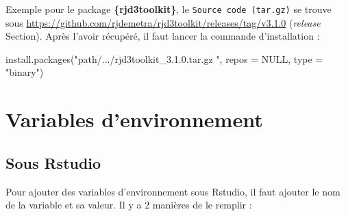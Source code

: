 \documentclass[
]{article}
\newenvironment{Shaded}{\begin{snugshade}}{\end{snugshade}}
\newcommand{\AttributeTok}[1]{\textcolor[rgb]{0.40,0.45,0.13}{#1}}
\newcommand{\ConstantTok}[1]{\textcolor[rgb]{0.56,0.35,0.01}{#1}}
\newcommand{\FunctionTok}[1]{\textcolor[rgb]{0.28,0.35,0.67}{#1}}
\newcommand{\NormalTok}[1]{\textcolor[rgb]{0.00,0.46,0.62}{#1}}
\newcommand{\StringTok}[1]{\textcolor[rgb]{0.13,0.47,0.30}{#1}}
\begin{document}
Exemple pour le package {\textbf{\{rjd3toolkit\}}}, le
\texttt{Source\ code\ (tar.gz)} se trouve sous
\textcolor{html_color}{\url{https://github.com/rjdemetra/rjd3toolkit/releases/tag/v3.1.0}}
(\emph{release} Section). Après l'avoir récupéré, il faut lancer la
commande d'installation :

\begin{Shaded}
\begin{Highlighting}[]
\FunctionTok{install.packages}\NormalTok{(}\StringTok{"path/.../rjd3toolkit\_3.1.0.tar.gz "}\NormalTok{,}
                 \AttributeTok{repos =} \ConstantTok{NULL}\NormalTok{, }\AttributeTok{type =} \StringTok{"binary"}\NormalTok{)}
\end{Highlighting}
\end{Shaded}

\hypertarget{var_env}{%
\section{Variables d'environnement}\label{var_env}}

\hypertarget{sous-rstudio}{%
\subsection{Sous Rstudio}\label{sous-rstudio}}

Pour ajouter des variables d'environnement sous Rstudio, il faut ajouter
le nom de la variable et sa valeur. Il y a 2 manières de le remplir :
\end{document}
